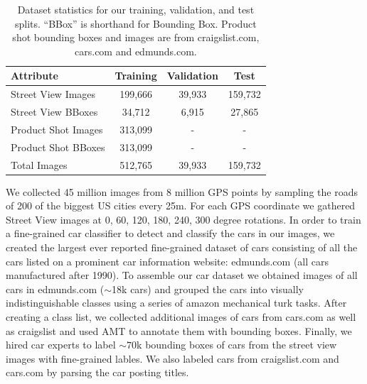 \documentclass[10pt,twocolumn,letterpaper]{article}
\begin{document}
\begin{table}
\begin{center}
\begin{tabular}{|l|c|c|c|}
\hline
\textbf{Attribute} & \textbf{Training} & \textbf{Validation} & \textbf{Test} \\
\hline\hline
Street View Images & 199,666 & 39,933 &159,732\\
Street View BBoxes & 34,712 & 6,915 &27,865\\
Product Shot Images & 313,099 & - &-\\
Product Shot BBoxes & 313,099 & - &-\\
Total Images &512,765&39,933&159,732\\
\hline
\end{tabular}
\end{center}
\caption{Dataset statistics for our training, validation, and test splits. ``BBox'' is shorthand for Bounding Box. Product shot bounding boxes and images are from craigslist.com, cars.com and edmunds.com.}
\end{table}

We collected 45 million images from 8 million GPS points by sampling the roads of 200 of the biggest US cities every 25m. For each GPS coordinate we gathered Street View images at 0, 60, 120, 180, 240, 300 degree rotations. In order to train a fine-grained car classifier to detect and classify the cars in our images, we created the largest ever reported fine-grained dataset of cars consisting of all the cars listed on a prominent car information website: edmunds.com (all cars manufactured after 1990). To assemble our car dataset we obtained images of all cars in edmunds.com (\(\sim\)18k cars) and grouped the cars into visually indistinguishable classes using a series of amazon mechanical turk tasks. After creating a class list, we collected additional images of cars from cars.com as well as craigslist and used AMT to annotate them with bounding boxes. Finally, we hired car experts to label \(\sim 70\)k bounding boxes of cars from the street view images with fine-grained lables. We also labeled cars from craigslist.com and cars.com by parsing the car posting titles. 
\end{document}
